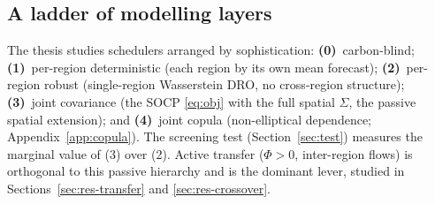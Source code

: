 \documentclass[10pt,twocolumn]{article}
\begin{document}
\subsection{A ladder of modelling layers}\label{sec:ladder}
The thesis studies schedulers arranged by sophistication: \textbf{(0)}~carbon-blind;
\textbf{(1)}~per-region deterministic (each region by its own mean forecast);
\textbf{(2)}~per-region robust (single-region Wasserstein DRO, no cross-region
structure); \textbf{(3)}~joint covariance (the SOCP \eqref{eq:obj} with the full
spatial $\Sigma$, the passive spatial extension); and \textbf{(4)}~joint copula
(non-elliptical dependence; Appendix~\ref{app:copula}). The screening test
(Section~\ref{sec:test}) measures the marginal value of (3) over (2). Active transfer
($\Phi>0$, inter-region flows) is orthogonal to this passive hierarchy and is the
dominant lever, studied in Sections~\ref{sec:res-transfer} and \ref{sec:res-crossover}.
\end{document}
